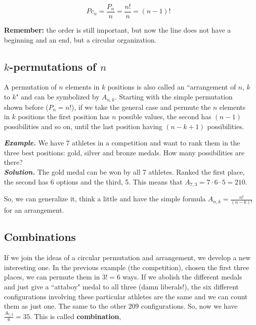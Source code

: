 \documentclass[a4paper,twocolumn]{article}
\begin{document}
\begin{equation}
\label{eq:circ-permutation}
Pc_n = \frac{P_n}{n} = \frac{n!}{n} = (n - 1)!
\end{equation}

\noindent\textbf{Remember:} the order is still important, but now the line does not have a beginning and an end, but a circular organization.


\subsection{$k$-permutations of $n$}
\label{subsec:arrang}

A permutation of $n$ elements in $k$ positions is also called an ``arrangement of $n$, $k$ to $k$" and can be symbolized by $A_{n,k}$. Starting with the simple permutation shown before ($P_n = n!$), if we take the general case and permute the $n$ elements in $k$ positions the first position has $n$ possible values, the second has $(n -1)$ possibilities and so on, until the last position having $(n - k + 1)$ possibilities.

\bigskip

\noindent\textbf{\textit{Example.}} We have 7 athletes in a competition and want to rank them in the three best positions: gold, silver and bronze medals. How many possibilities are there?\\
\noindent\textbf{\textit{Solution.}} The gold medal can be won by all 7 athletes. Ranked the first place, the second has 6 options and the third, 5. This means that $A_{7,3} = 7 \cdot 6 \cdot 5 = 210$.

\bigskip

\noindent So, we can generalize it, think a little and have the simple formula $A_{n,k} = \frac{n!}{(n - k)!}$ for an arrangement.


\subsection{Combinations}
\label{subsec:comb}

If we join the ideas of a circular permutation and arrangement, we develop a new interesting one. In the previous example (the competition), chosen the first three places, we can permute them in $3! = 6$ ways. If we abolish the different medals and just give a ``attaboy" medal to all three (damn liberals!), the six different configurations involving these particular athletes are the same and we can count them as just one. The same to the other 209 configurations. So, now we have $\frac{A_{7,3}}{6} = 35$. This is called \textbf{combination},
\end{document}
